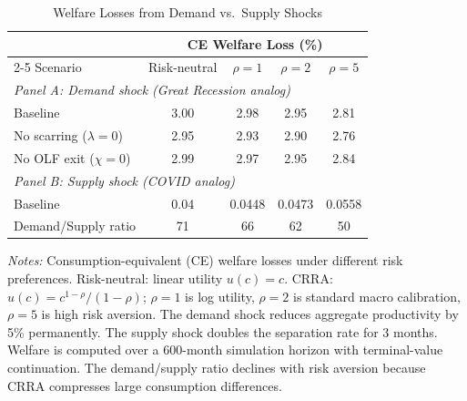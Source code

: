 \begin{table}[H]
\centering
\caption{Welfare Losses from Demand vs.\ Supply Shocks}
\begin{threeparttable}
\small
\begin{tabular}{lcccc}
\toprule
& \multicolumn{4}{c}{CE Welfare Loss (\%)} \\
\cmidrule(lr){2-5}
Scenario & Risk-neutral & $\rho=1$ & $\rho=2$ & $\rho=5$ \\
\midrule
\multicolumn{5}{l}{\textit{Panel A: Demand shock (Great Recession analog)}} \\[3pt]
Baseline & 3.00 & 2.98 & 2.95 & 2.81 \\
No scarring ($\lambda = 0$) & 2.95 & 2.93 & 2.90 & 2.76 \\
No OLF exit ($\chi = 0$) & 2.99 & 2.97 & 2.95 & 2.84 \\
\midrule
\multicolumn{5}{l}{\textit{Panel B: Supply shock (COVID analog)}} \\[3pt]
Baseline & 0.04 & 0.0448 & 0.0473 & 0.0558 \\
\midrule
Demand/Supply ratio & 71 & 66 & 62 & 50 \\
\bottomrule
\end{tabular}
\begin{tablenotes}[flushleft]
\small
\item \textit{Notes:} Consumption-equivalent (CE) welfare losses under different risk preferences. Risk-neutral: linear utility $u(c) = c$. CRRA: $u(c) = c^{1-\rho}/(1-\rho)$; $\rho = 1$ is log utility, $\rho = 2$ is standard macro calibration, $\rho = 5$ is high risk aversion. The demand shock reduces aggregate productivity by 5\% permanently. The supply shock doubles the separation rate for 3 months. Welfare is computed over a 600-month simulation horizon with terminal-value continuation. The demand/supply ratio declines with risk aversion because CRRA compresses large consumption differences.
\end{tablenotes}
\end{threeparttable}
\label{tab:welfare}
\end{table}
